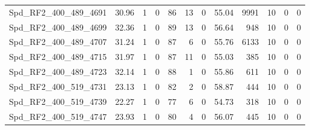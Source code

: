 \begin{longtable}[c]{@{}lrrrrrrrrrrr@{}}
Spd\_RF2\_400\_489\_4691     & 30.96                  & 1                       & 0                       & 86                     & 13                      & 0                       & 55.04                   & 9991                     & 10                       & 0                        & 0                        \\
Spd\_RF2\_400\_489\_4699     & 32.36                  & 1                       & 0                       & 89                     & 13                      & 0                       & 56.64                   & 948                      & 10                       & 0                        & 0                        \\
Spd\_RF2\_400\_489\_4707     & 31.24                  & 1                       & 0                       & 87                     & 6                       & 0                       & 55.76                   & 6133                     & 10                       & 0                        & 0                        \\
Spd\_RF2\_400\_489\_4715     & 31.97                  & 1                       & 0                       & 87                     & 11                      & 0                       & 55.03                   & 385                      & 10                       & 0                        & 0                        \\
Spd\_RF2\_400\_489\_4723     & 32.14                  & 1                       & 0                       & 88                     & 1                       & 0                       & 55.86                   & 611                      & 10                       & 0                        & 0                        \\
Spd\_RF2\_400\_519\_4731     & 23.13                  & 1                       & 0                       & 82                     & 2                       & 0                       & 58.87                   & 444                      & 10                       & 0                        & 0                        \\
Spd\_RF2\_400\_519\_4739     & 22.27                  & 1                       & 0                       & 77                     & 6                       & 0                       & 54.73                   & 318                      & 10                       & 0                        & 0                        \\
Spd\_RF2\_400\_519\_4747     & 23.93                  & 1                       & 0                       & 80                     & 4                       & 0                       & 56.07                   & 445                      & 10                       & 0                        & 0                        \\

\end{longtable}
